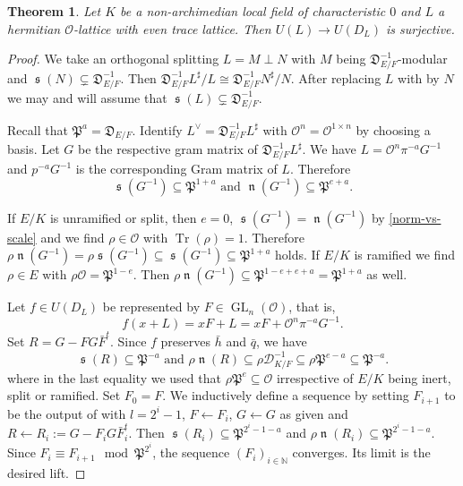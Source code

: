 \documentclass[a4paper]{amsart}
\theoremstyle{definition}
\theoremstyle{plain}
\newtheorem{theorem}[definition]{Theorem}
\DeclareMathOperator{\GL}{GL}
\DeclareMathOperator{\Tr}{Tr}
\DeclareMathOperator{\scale}{\mathfrak{s}}
\DeclareMathOperator{\norm}{\mathfrak{n}}
\newcommand{\NN}{\mathbb{N}}
\renewcommand{\O}{\mathcal{O}}
\newcommand{\FP}{\mathfrak{P}}
\newcommand{\FD}{\mathfrak{D}}
\newcommand{\disc}[1]{{D_{#1}}}
\begin{document}
\begin{theorem}\label{Usurj}
  Let $K$ be a non-archimedian local field of characteristic $0$ and $L$ a hermitian $\O$-lattice with even trace lattice.
 Then
  $U(L) \to U(D_L)$
 is surjective.
\end{theorem}
\begin{proof}
 We take an orthogonal splitting $L = M \perp N$ with $M$ being
 ${\FD_{E/F}^{-1}}$-modular and $\scale(N) \subsetneq {\FD_{E/F}^{-1}}$.
 Then ${\FD_{E/F}^{-1}} L^\sharp/L \cong {\FD_{E/F}^{-1}} N^\sharp/N$.
 After replacing $L$ with by $N$ we may and will assume that $ \scale(L) \subsetneq {\FD_{E/F}^{-1}}$.

 Recall that $\FP^a =\FD_{E/F}$.
  Identify $L^\vee={\FD_{E/F}^{-1}}L^\sharp$ with $\O^n= \O^{1 \times n}$ by choosing a basis. Let $G$ be the respective gram matrix of ${\FD_{E/F}^{-1}}L^\sharp$. We have $L = \O^n \pi^{-a}  G^{-1}$ and $p^{-a} G^{-1}$ is the corresponding Gram matrix of $L$.
 Therefore
 \[\scale(G^{-1}) \subseteq \FP^{1+a} \text{ and }\norm(G^{-1})\subseteq \FP^{e+a}.\]

 If $E/K$ is unramified or split, then $e=0$, $\scale(G^{-1})=\norm(G^{-1})$ by \cref{norm-vs-scale} and we find $\rho \in \mathcal{O}$ with $\Tr(\rho)=1$. Therefore $\rho\norm(G^{-1}) =\rho \scale(G^{-1}) \subseteq \scale(G^{-1})\subseteq \FP^{1+a}$ holds.
 If $E/K$ is ramified we find $\rho \in E$ with $\rho \O = \FP^{1-e}$. Then
 $\rho \norm(G^{-1}) \subseteq \FP^{1-e+e+a}=\FP^{1+a}$ as well.

 Let $f \in U(\disc{L})$ be represented by $F \in \GL_n(\O)$,
 that is,
 \[f(x + L) = x F + L = x F + \O^{n} \pi^{-a}G^{-1} .\]
 Set $R = G - F G \bar F^t$. Since $f$ preserves $\bar h$ and $\bar q$, we have
 \[\scale(R) \subseteq \FP^{-a} \text{ and } \rho\norm(R) \subseteq \rho\mathcal{D}_{K/F}^{-1}\subseteq\rho\FP^{e-a}\subseteq\FP^{-a}.\]
 where in the last equality we used that $\rho\FP^e \subseteq \mathcal{O}$ irrespective of $E/K$ being inert, split or ramified.
 Set $F_0 = F$. We inductively define a sequence by setting $F_{i+1}$ to be the output of
  with $l = 2^i-1$, $F \gets F_i$, $G \gets G$ as given and
  $R \gets R_i:= G - F_i G \bar F_i^t$. 
 Then $\scale(R_i) \subseteq \FP^{2^i-1 -a }$ and $\rho\norm(R_i) \subseteq \FP^{2^i-1-a}$.
 Since $F_i \equiv F_{i+1} \mod \FP^{2^i}$, the sequence $(F_i)_{i \in \NN}$ converges.
 Its limit is the desired lift.
%
%
%
%
%
%
%
%
%
%
%
%
%
%
%
%
%
%
%
%
%
%
%
%
%
%
%
%
%
%
%
%
%
%
%
%
\end{proof}
\end{document}
